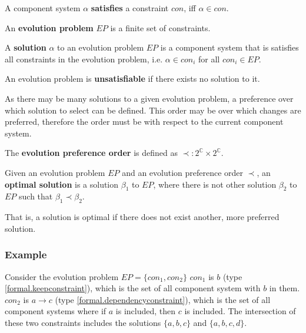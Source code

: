 \begin{defs}
\label{formal.constraintdefs}
A component system $\alpha$ \textbf{satisfies} a constraint $con$, iff $\alpha \in con$.
\end{defs}

\begin{defs}
An \textbf{evolution problem} $EP$ is a finite set of constraints.
\end{defs}

\begin{defs}
A \textbf{solution} $\alpha$ to an evolution problem $EP$ is a component system that is satisfies all constraints in the evolution problem, i.e. $\alpha \in con_i$ for all $con_i \in EP$.  
\end{defs}

\begin{defs}
An evolution problem is \textbf{unsatisfiable} if there exists no solution to it.  
\end{defs}

As there may be many solutions to a given evolution problem, a preference over which solution to select can be defined.
This order may be over which changes are preferred, therefore the order must be with respect to the current component system. 
\begin{defs}
The \textbf{evolution preference order} is defined as $\prec: 2^{\mathbb{C}} \times 2^{\mathbb{C}}$.
\end{defs}

\begin{defs}
Given an evolution problem $EP$ and an evolution preference order $\prec$, 
an \textbf{optimal solution} is a solution $\beta_1$ to $EP$, where there is not other solution $\beta_2$ to $EP$ such that $\beta_1 \prec \beta_2$.
\end{defs}
That is, a solution is optimal if there does not exist another, more preferred solution.

\subsubsection{Example}
Consider the evolution problem $EP = \{con_1,con_2\}$
$con_1$ is $b$ (type \ref{formal.keepconstraint}), which is the set of all component system with $b$ in them.
$con_2$ is $a \rightarrow c$ (type \ref{formal.dependencyconstraint}), which is the set of all component systems where if $a$ is included, then $c$ is included.
The intersection of these two constraints includes the solutions $\{a,b,c\}$ and $\{a,b,c,d\}$.

